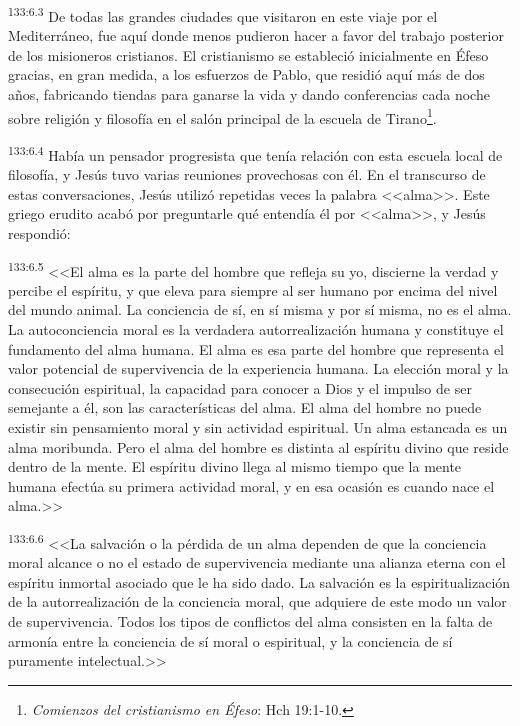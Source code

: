 \par 
\textsuperscript{133:6.3} De todas las grandes ciudades que visitaron en este viaje por el Mediterráneo, fue aquí donde menos pudieron hacer a favor del trabajo posterior de los misioneros cristianos. El cristianismo se estableció inicialmente en Éfeso gracias, en gran medida, a los esfuerzos de Pablo, que residió aquí más de dos años, fabricando tiendas para ganarse la vida y dando conferencias cada noche sobre religión y filosofía en el salón principal de la escuela de Tirano\footnote{\textit{Comienzos del cristianismo en Éfeso}: Hch 19:1-10.}.

\par 
\textsuperscript{133:6.4} Había un pensador progresista que tenía relación con esta escuela local de filosofía, y Jesús tuvo varias reuniones provechosas con él. En el transcurso de estas conversaciones, Jesús utilizó repetidas veces la palabra <<alma>>. Este griego erudito acabó por preguntarle qué entendía él por <<alma>>, y Jesús respondió:

\par 
\textsuperscript{133:6.5} <<El alma es la parte del hombre que refleja su yo, discierne la verdad y percibe el espíritu, y que eleva para siempre al ser humano por encima del nivel del mundo animal. La conciencia de sí, en sí misma y por sí misma, no es el alma. La autoconciencia moral es la verdadera autorrealización humana y constituye el fundamento del alma humana. El alma es esa parte del hombre que representa el valor potencial de supervivencia de la experiencia humana. La elección moral y la consecución espiritual, la capacidad para conocer a Dios y el impulso de ser semejante a él, son las características del alma. El alma del hombre no puede existir sin pensamiento moral y sin actividad espiritual. Un alma estancada es un alma moribunda. Pero el alma del hombre es distinta al espíritu divino que reside dentro de la mente. El espíritu divino llega al mismo tiempo que la mente humana efectúa su primera actividad moral, y en esa ocasión es cuando nace el alma.>>

\par 
\textsuperscript{133:6.6} <<La salvación o la pérdida de un alma dependen de que la conciencia moral alcance o no el estado de supervivencia mediante una alianza eterna con el espíritu inmortal asociado que le ha sido dado. La salvación es la espiritualización de la autorrealización de la conciencia moral, que adquiere de este modo un valor de supervivencia. Todos los tipos de conflictos del alma consisten en la falta de armonía entre la conciencia de sí moral o espiritual, y la conciencia de sí puramente intelectual.>>

